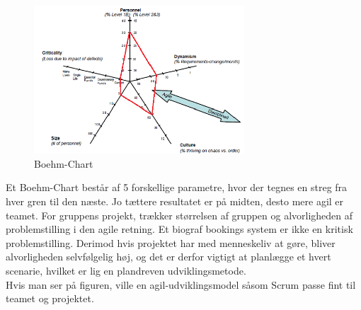 \begin{figure}[H]
    \centering
    \includegraphics[width=0.7\textwidth]{figures/Boehm-chart.png}
    \caption{Boehm-Chart}
    \label{fig:Boehm}
\end{figure}

Et Boehm-Chart består af 5 forskellige parametre, hvor der tegnes en streg fra hver gren til den næste. 
Jo tættere resultatet er på midten, desto mere agil er teamet. 
For gruppens projekt, trækker størrelsen af gruppen og alvorligheden af problemstilling i den agile retning. 
Et biograf bookings system er ikke en kritisk problemstilling. Derimod hvis projektet har med menneskeliv at gøre, 
bliver alvorligheden selvfølgelig høj, og det er derfor vigtigt at planlægge et hvert scenarie, 
hvilket er lig en plandreven udviklingsmetode.\\

Hvis man ser på figuren, ville en agil-udviklingsmodel såsom Scrum passe fint til teamet og projektet. 

